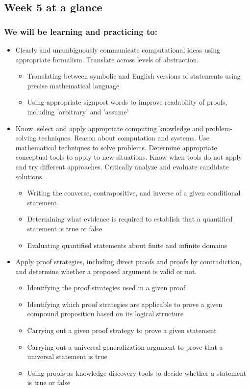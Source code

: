 \documentclass[12pt, oneside]{article}
\begin{document}
\begin{flushright}
\end{flushright} 
\subsection*{Week 5 at a glance}

\subsubsection*{We will be learning and practicing to:}
\begin{itemize}

\item Clearly and unambiguously communicate computational ideas using appropriate formalism. Translate across levels of abstraction.
\begin{itemize}
   \item Translating between symbolic and English versions of statements using precise mathematical language
    \item Using appropriate signpost words to improve readability of proofs, including 'arbitrary' and 'assume'
\end{itemize}

\item Know, select and apply appropriate computing knowledge and problem-solving techniques. Reason about computation and systems. Use mathematical techniques to solve problems. Determine appropriate conceptual tools to apply to new situations. Know when tools do not apply and try different approaches. Critically analyze and evaluate candidate solutions.
\begin{itemize}
    \item Writing the converse, contrapositive, and inverse of a given conditional statement
    \item Determining what evidence is required to establish that a quantified statement is true or false
    \item Evaluating quantified statements about finite and infinite domains
\end{itemize}

\item Apply proof strategies, including direct proofs and proofs by contradiction, and determine whether a proposed argument is valid or not.
\begin{itemize}
    \item Identifying the proof strategies used in a given proof
    \item Identifying which proof strategies are applicable to prove a given compound proposition based on its logical structure
    \item Carrying out a given proof strategy to prove a given statement
    \item Carrying out a universal generalization argument to prove that a universal statement is true
    \item Using proofs as knowledge discovery tools to decide whether a statement is true or false
\end{itemize}
\end{itemize}
\end{document}
